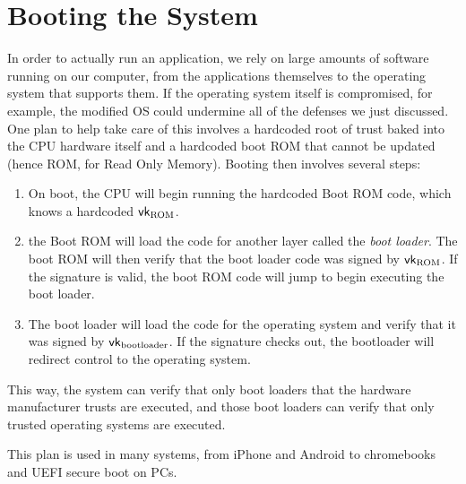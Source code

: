\section{Booting the System}
In order to actually run an application, we rely on large amounts of software running on our computer, from the applications themselves to the operating system that supports them. If the operating system itself is compromised, for example, the modified OS could undermine all of the defenses we just discussed. One plan to help take care of this involves a hardcoded root of trust baked into the CPU hardware itself and a hardcoded boot ROM that cannot be updated (hence ROM, for Read Only Memory). Booting then involves several steps:
\begin{enumerate}
	\item On boot, the CPU will begin running the hardcoded Boot ROM code, which knows a hardcoded $\mathsf{vk}_\text{ROM}$.
	\item the Boot ROM will load the code for another layer called the \emph{boot loader}. The boot ROM will then verify that the boot loader code was signed by $\mathsf{vk}_\text{ROM}$. If the signature is valid, the boot ROM code will jump to begin executing the boot loader.
	\item The boot loader will load the code for the operating system and verify that it was signed by $\mathsf{vk}_\text{bootloader}$. If the signature checks out, the bootloader will redirect control to the operating system.
\end{enumerate}

This way, the system can verify that only boot loaders that the hardware manufacturer trusts are executed, and those boot loaders can verify that only trusted operating systems are executed.

This plan is used in many systems, from iPhone and Android to chromebooks and UEFI secure boot on PCs.
